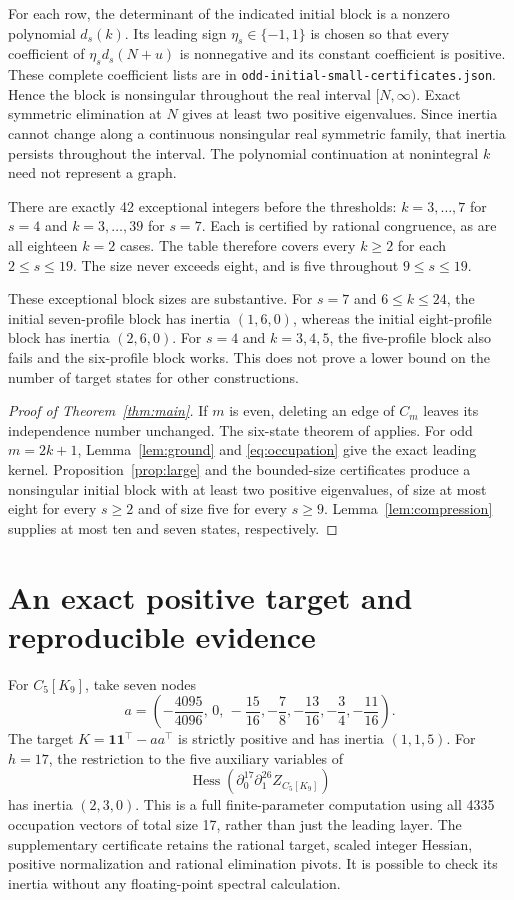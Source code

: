 \documentclass[11pt]{article}
\theoremstyle{remark}\newtheorem{remark}[theorem]{Remark}
\DeclareMathOperator{\Hess}{Hess}
\newcommand{\one}{\mathbf 1}
\begin{document}
For each row, the determinant of the indicated initial block
is a nonzero polynomial $d_s(k)$.
Its leading sign $\eta_s\in\{-1,1\}$ is chosen so that every
coefficient of $\eta_s d_s(N+u)$ is nonnegative and its constant
coefficient is positive. These complete coefficient lists are in
\texttt{odd-initial-small-certificates.json}.
Hence the block is nonsingular throughout the real interval
$[N,\infty)$. Exact symmetric elimination at $N$ gives at least
two positive eigenvalues. Since inertia cannot change along a
continuous nonsingular real symmetric family, that inertia
persists throughout the interval. The polynomial continuation
at nonintegral $k$ need not represent a graph.

There are exactly 42 exceptional integers before the thresholds:
$k=3,\ldots,7$ for $s=4$ and $k=3,\ldots,39$ for $s=7$.
Each is certified by rational congruence, as are all eighteen
$k=2$ cases. The table therefore covers every $k\ge2$ for
each $2\le s\le19$. The size never exceeds eight, and is five
throughout $9\le s\le19$.

These exceptional block sizes are substantive.
For $s=7$ and $6\le k\le24$, the initial seven-profile block has
inertia $(1,6,0)$, whereas the initial eight-profile block has
inertia $(2,6,0)$. For $s=4$ and $k=3,4,5$, the five-profile
block also fails and the six-profile block works.
This does not prove a lower bound on the number of target
states for other constructions.

\begin{proof}[Proof of Theorem~\ref{thm:main}]
If $m$ is even, deleting an edge of $C_m$ leaves its independence
number unchanged. The six-state theorem of \cite{SixSpin} applies.
For odd $m=2k+1$, Lemma~\ref{lem:ground} and
\eqref{eq:occupation} give the exact leading kernel.
Proposition~\ref{prop:large} and the bounded-size certificates
produce a nonsingular initial block with at least two positive
eigenvalues, of size at most eight for every $s\ge2$ and of size
five for every $s\ge9$.
Lemma~\ref{lem:compression} supplies at most ten and seven states,
respectively.
\end{proof}

\section{An exact positive target and reproducible evidence}
For $C_5[K_9]$, take seven nodes
\begin{equation}
 a=\left(-\frac{4095}{4096},\,0,\,
 -\frac{15}{16},-\frac78,-\frac{13}{16},
 -\frac34,-\frac{11}{16}\right).                       \label{eq:witness}
\end{equation}
The target $K=\one\one^\top-aa^\top$ is strictly positive
and has inertia $(1,1,5)$.
For $h=17$, the restriction to the five auxiliary variables of
\[
 \Hess(\partial_0^{17}\partial_1^{26}Z_{C_5[K_9]})
\]
has inertia $(2,3,0)$.
This is a full finite-parameter computation using all 4335
occupation vectors of total size 17, rather than just the
leading layer. The supplementary certificate retains the
rational target, scaled integer Hessian, positive normalization
and rational elimination pivots. It is possible to check its
inertia without any floating-point spectral calculation.
\end{document}
